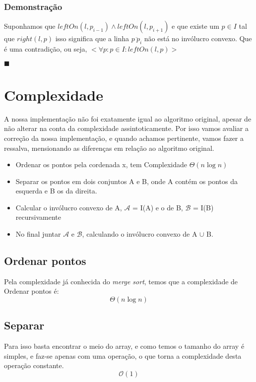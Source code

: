 \documentclass[11pt]{article}
\begin{document}
\subsubsection{Demonstração}
Suponhamos que $leftOn(l, p_{i-1}) \wedge leftOn(l, p_{i+1})$ 
e que existe um $p \in I$ tal que $right(l, p)$
isso significa que a linha $\overline{p\ p_i}$ não está no invólucro convexo.
Que é uma contradição, ou seja, $<\forall p : p \in I : leftOn(l, p)>$

\hfill $\blacksquare$


\section{Complexidade}
A nossa implementação não foi exatamente igual ao algoritmo original,
apesar de não alterar na conta da complexidade assintoticamente.
Por isso vamos avaliar a correção da nossa implementação, e quando 
achamos pertinente, vamos fazer a ressalva, mensionando as diferenças 
em relação ao algoritmo original.

\begin{itemize}
    \item Ordenar os pontos pela cordenada x, tem Complexidade $\Theta(n\log{}n)$
    \item Separar os pontos em dois conjuntos A e B, onde A contém os pontos da esquerda e B os da direita.
    \item Calcular o invólucro convexo de A, $\mathcal{A}$ = I(A) e o de B, $\mathcal{B}$ = I(B) recursivamente
    \item No final juntar $\mathcal{A}$ e $\mathcal{B}$, calculando o invólucro convexo de A $\cup$ B.
\end{itemize}

\subsection{Ordenar pontos}
Pela complexidade já conhecida do \textit{merge sort}, 
temos que a complexidade de Ordenar pontos é:
$$\Theta(n\log{}n)$$

\subsection{Separar}
Para isso basta encontrar o meio do array,
e como temos o tamanho do array é simples, e faz-se apenas com uma operação,
o que torna a complexidade desta operação constante. 
$$\mathcal{O}(1)$$
\end{document}
